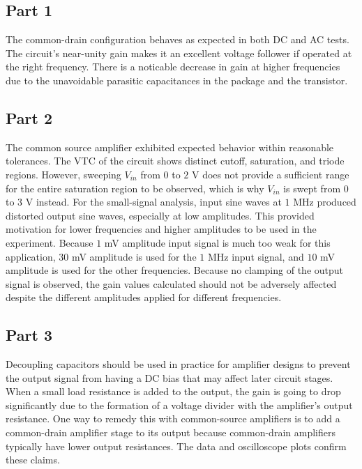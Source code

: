 \subsection{Part 1}
The common-drain configuration behaves as expected in both DC and AC tests. The circuit's near-unity gain makes it an excellent voltage follower if operated at the right frequency.
There is a noticable decrease in gain at higher frequencies due to the unavoidable parasitic capacitances in the package and the transistor.
\subsection{Part 2}
The common source amplifier exhibited expected behavior within reasonable tolerances.
The VTC of the circuit shows distinct cutoff, saturation, and triode regions.
However, sweeping $V_{in}$ from $0$ to $2$ \si{\volt} does not provide a sufficient range for the entire saturation region to be observed, which is why $V_{in}$ is swept from $0$ to $3$ \si{\volt} instead. 
For the small-signal analysis, input sine waves at $1$ \si{\mega\hertz} produced distorted output sine waves, especially at low amplitudes. 
This provided motivation for lower frequencies and higher amplitudes to be used in the experiment.
Because $1$ \si{\milli\volt} amplitude input signal is much too weak for this application, $30$ \si{\milli\volt} amplitude is used for the $1$ \si{\mega\hertz} input signal, and $10$ \si{\milli\volt} amplitude is used for the other frequencies.
Because no clamping of the output signal is observed, the gain values calculated should not be adversely affected despite the different amplitudes applied for different frequencies.
\subsection{Part 3}
Decoupling capacitors should be used in practice for amplifier designs to prevent the output signal from having a DC bias that may affect later circuit stages.
When a small load resistance is added to the output, the gain is going to drop significantly due to the formation of a voltage divider with the amplifier's output resistance.
One way to remedy this with common-source amplifiers is to add a common-drain amplifier stage to its output because common-drain amplifiers typically have lower output resistances.
The data and oscilloscope plots confirm these claims.
